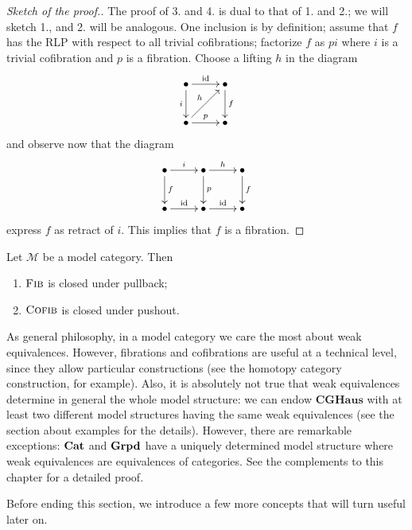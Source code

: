 \begin{proof}[Sketch of the proof.]
The proof of 3. and 4. is dual to that of 1. and 2.; we will sketch 1., and 2. will be analogous. One inclusion is by definition; assume that $f$ has the RLP with respect to all trivial cofibrations; factorize $f$ as $pi$ where $i$ is a trivial cofibration and $p$ is a fibration. Choose a lifting $h$ in the diagram
\[
\xymatrix{
\bullet \ar[r]^{\mathrm{id}} \ar[d]_i & \bullet \ar[d]^f \\ \bullet \ar[r]^p \ar[ur]^h & \bullet
}
\]
and observe now that the diagram
\[
\xymatrix{
\bullet \ar[r]^i \ar[d]^f & \bullet \ar[d]^p \ar[r]^h & \bullet \ar[d]^f \\ \bullet \ar[r]^{\mathrm{id}} & \bullet \ar[r]^{\mathrm{id}} & \bullet
}
\]
express $f$ as retract of $i$. This implies that $f$ is a fibration.
\end{proof}

\begin{cor} \label{cor stability for base and cobase change}
Let $\mathcal M$ be a model category. Then
\begin{enumerate}
\item $\textsc{Fib}$ is closed under pullback;
\item $\textsc{Cofib}$ is closed under pushout.
\end{enumerate}
\end{cor}

\begin{rmk}
As general philosophy, in a model category we care the most about weak equivalences. However, fibrations and cofibrations are useful at a technical level, since they allow particular constructions (see the homotopy category construction, for example). Also, it is absolutely not true that weak equivalences determine in general the whole model structure: we can endow $\mathbf{CGHaus}$ with at least two different model structures having the same weak equivalences (see the section about examples for the details). However, there are remarkable exceptions: $\mathbf{Cat}$ and $\mathbf{Grpd}$ have a uniquely determined model structure where weak equivalences are equivalences of categories. See the complements to this chapter for a detailed proof.
\end{rmk}

Before ending this section, we introduce a few more concepts that will turn useful later on.


